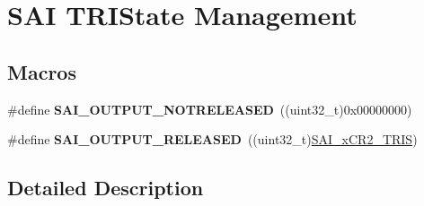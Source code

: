 \hypertarget{group___s_a_i___t_r_i_state___management}{}\section{S\+AI T\+R\+I\+State Management}
\label{group___s_a_i___t_r_i_state___management}
\subsection*{Macros}
\begin{DoxyCompactItemize}
\item 
\#define {\bfseries S\+A\+I\+\_\+\+O\+U\+T\+P\+U\+T\+\_\+\+N\+O\+T\+R\+E\+L\+E\+A\+S\+ED}~((uint32\+\_\+t)0x00000000)\hypertarget{group___s_a_i___t_r_i_state___management_ga447e10f5f9f3021571ed2cec8fe12b96}{}\label{group___s_a_i___t_r_i_state___management_ga447e10f5f9f3021571ed2cec8fe12b96}

\item 
\#define {\bfseries S\+A\+I\+\_\+\+O\+U\+T\+P\+U\+T\+\_\+\+R\+E\+L\+E\+A\+S\+ED}~((uint32\+\_\+t)\hyperlink{group___peripheral___registers___bits___definition_gabb67ecd983af1e4f8c9a5935c013752d}{S\+A\+I\+\_\+x\+C\+R2\+\_\+\+T\+R\+IS})\hypertarget{group___s_a_i___t_r_i_state___management_ga5fc0fb414364a98a5c4e7982b5d7c382}{}\label{group___s_a_i___t_r_i_state___management_ga5fc0fb414364a98a5c4e7982b5d7c382}

\end{DoxyCompactItemize}


\subsection{Detailed Description}
